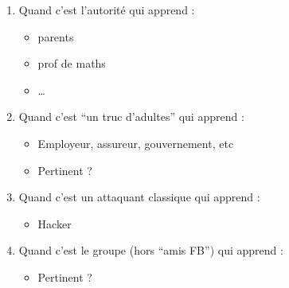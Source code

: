 \documentclass{article}
\begin{document}
\begin{enumerate}
\item Quand c'est l'autorité qui apprend :
  \begin{itemize}
  \item parents
  \item prof de maths
  \item \ldots
  \end{itemize}

\item Quand c'est ``un truc d'adultes'' qui apprend :
  \begin{itemize}
  \item Employeur, assureur, gouvernement, etc
  \item Pertinent ? 
  \end{itemize}

\item Quand c'est un attaquant classique qui apprend : 
  \begin{itemize}
  \item Hacker 
  \end{itemize}

\item Quand c'est le groupe (hors ``amis FB'') qui apprend : 
  \begin{itemize}
  \item Pertinent ? 
  \end{itemize}

\end{enumerate}
\end{document}
